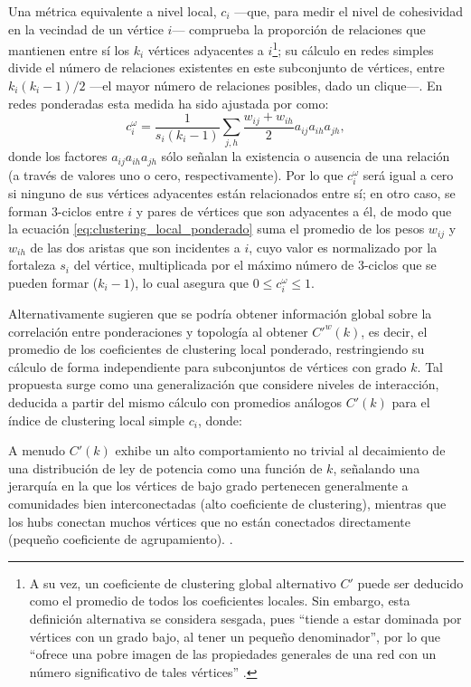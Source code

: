 \documentclass[letterpaper, 11pt]{book}
\theoremstyle{definition}
\theoremstyle{remark}
\begin{document}
Una métrica equivalente a nivel local, $c_{i}$ ---que, para medir el nivel de cohesividad en la vecindad de un vértice $i$--- comprueba la proporción de relaciones que mantienen entre sí los $k_{i}$ vértices adyacentes a $i$\footnote{
    A su vez, un coeficiente de clustering global alternativo $C'$ puede ser deducido como el promedio de todos los coeficientes locales. 
    Sin embargo, esta definición alternativa se considera sesgada, pues ``tiende a estar dominada por vértices con un grado bajo, al tener un pequeño denominador'', por lo que ``ofrece una pobre imagen de las propiedades generales de una red con un número significativo de tales vértices'' \citep[206]{2010_Newman_Networks}. 
}; su cálculo en redes simples divide el número de relaciones existentes en este subconjunto de vértices, entre $k_{i}(k_{i}-1)/2$ ---el mayor número de relaciones posibles, dado un clique---. 
En redes ponderadas esta medida ha sido ajustada por \citet{2004_Barrat_ComplexNetworks} como:
\begin{equation}\label{eq:clustering_local_ponderado}
    c_{i}^{\omega} = 
    \frac{1}{s_{i}(k_{i}-1)}\sum_{j,h}\frac{w_{ij} + w_{ih}}{2}a_{ij}a_{ih}a_{jh},
\end{equation}
donde los factores $a_{ij}a_{ih}a_{jh}$ sólo señalan la existencia o ausencia de una relación (a través de valores uno o cero, respectivamente). 
Por lo que $c_{i}^{\omega}$ será igual a cero si ninguno de sus vértices adyacentes están relacionados entre sí; en otro caso, se forman 3-ciclos entre $i$ y pares de vértices que son adyacentes a él, de modo que la ecuación \ref{eq:clustering_local_ponderado} suma el promedio de los pesos $w_{ij}$ y $w_{ih}$ de las dos aristas que son incidentes a $i$, cuyo valor es normalizado por la fortaleza $s_{i}$ del vértice, multiplicada por el máximo número de 3-ciclos que se pueden formar ($k_{i}-1$), lo cual asegura que $0 \leq c_{i}^{\omega} \leq 1$. 

Alternativamente \citet{2004_Barrat_ComplexNetworks} sugieren que se podría obtener información global sobre la correlación entre ponderaciones y topología al obtener $C'^{w}(k)$, es decir, el promedio de los coeficientes de clustering local ponderado, restringiendo su cálculo de forma independiente para subconjuntos de vértices con grado $k$. 
Tal propuesta surge como una generalización que considere niveles de interacción, deducida a partir del mismo cálculo con promedios análogos $C'(k)$ para el índice de clustering local simple $c_{i}$, donde:
\begin{center}
    \begin{minipage}{0.9\linewidth}
        {\setlength{\parindent}{12pt}\small
        A menudo $C'(k)$ exhibe un alto comportamiento no trivial al decaimiento de una distribución de ley de potencia como una función de $k$, señalando una jerarquía en la que los vértices de bajo grado pertenecen generalmente a comunidades bien interconectadas (alto coeficiente de clustering), mientras que los hubs conectan muchos vértices que no están conectados directamente (pequeño coeficiente de agrupamiento).
        \normalsize \citep[4]{2004_Barrat_ComplexNetworks}. 
        }
    \end{minipage}
\end{center}
\end{document}
